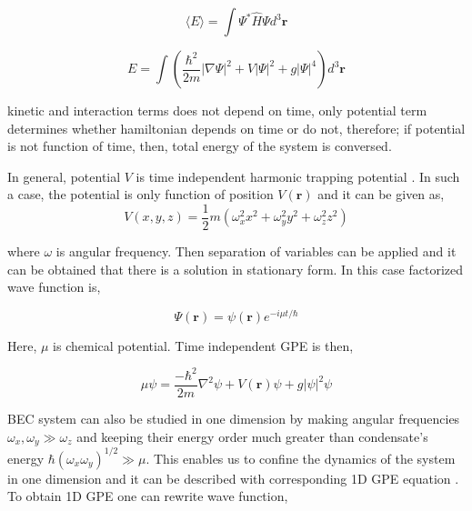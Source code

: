 \documentclass[a4paper,times,12pt]{article}
\begin{document}
\begin{equation}
\label{GPE_total_energy_general}
\langle E \rangle = \int \Psi^{*}\hat{H}\Psi d^3\boldsymbol{r}
\end{equation}

\begin{equation}
\label{GPE_total_energy}
E = \int \left(\frac {\hbar^2}{2m}|\nabla
\Psi|^2 + V|\Psi|^2 + g|\Psi|^4 \right) d^3\boldsymbol{r}
\end{equation}

\noindent kinetic and interaction terms does not depend on time, only potential term determines whether hamiltonian depends on time or do not, therefore; if potential is not function of time, then, total energy of the system is conversed.

In general, potential $V$ is time independent harmonic trapping potential \cite{barenghi2016primer}. In such a case, the potential is only function of position $V(\boldsymbol{r})$ and it can be given as,
\begin{equation}
\label{eq:GPE_harmonic_potential}
V(x, y, z) = \frac{1}{2}m(\omega_x^2 x^2 + \omega_y^2y^2 + \omega_z^2z^2)
\end{equation}


\noindent where $\omega$ is angular frequency. Then separation of variables can be applied and it can be obtained that there is a solution in stationary form. In this case factorized wave function is,

\begin{equation}
\label{eq:GPE_time_indep_wave_func}
\Psi(\boldsymbol{r}) = \psi(\boldsymbol{r})e^{-i\mu t/\hbar}
\end{equation}

\noindent Here, $\mu$ is chemical potential. Time independent GPE is then,

\begin{equation}
\label{eq:GPE_time_indep}
\mu\psi = \frac{-\hbar^2}{2m}\nabla^2\psi + V(\boldsymbol{r})\psi + g|\psi|^2\psi 
\end{equation}

BEC system can also be studied in one dimension by making angular frequencies $\omega_x, \omega_y \gg \omega_z$ and keeping their energy order much greater than condensate's energy $ \hbar(\omega_x \omega_y)^{1/2} \gg \mu $. This enables us to confine the dynamics of the system in one dimension and it can be described with corresponding 1D GPE equation \cite{barenghi2016primer}. To obtain 1D GPE one can rewrite wave function,
\end{document}
